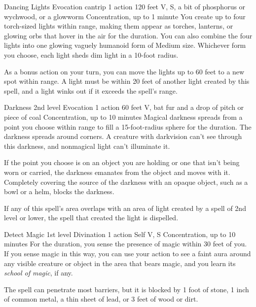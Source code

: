 \documentclass[10pt,a4paper,twoside,bg=print,twocolumn,openany,nodeprecatedcode]{dndbook}
\begin{document}


\DndSpellHeader%
{Dancing Lights}
{Evocation cantrip}
{1 action}
{120 feet}
{V, S, a bit of phosphorus or wychwood, or a glowworm}
{Concentration, up to 1 minute}
You create up to four torch-sized lights within range, making them appear as torches, lanterns, or glowing orbs that hover in the air for the duration. You can also combine the four lights into one glowing vaguely humanoid form of Medium size. Whichever form you choose, each light sheds dim light in a 10-foot radius.

As a bonus action on your turn, you can move the lights up to 60 feet to a new spot within range. A light must be within 20 feet of another light created by this spell, and a light winks out if it exceeds the spell's range.



\DndSpellHeader%
{Darkness}
{2nd level Evocation}
{1 action}
{60 feet}
{V, bat fur and a drop of pitch or piece of coal}
{Concentration, up to 10 minutes}
Magical darkness spreads from a point you choose within range to fill a 15-foot-radius sphere for the duration. The darkness spreads around corners. A creature with darkvision can't see through this darkness, and nonmagical light can't illuminate it.

If the point you choose is on an object you are holding or one that isn't being worn or carried, the darkness emanates from the object and moves with it. Completely covering the source of the darkness with an opaque object, such as a bowl or a helm, blocks the darkness.

If any of this spell's area overlaps with an area of light created by a spell of 2nd level or lower, the spell that created the light is dispelled.



\DndSpellHeader%
{Detect Magic}
{1st level Divination}
{1 action}
{Self}
{V, S}
{Concentration, up to 10 minutes}
For the duration, you sense the presence of magic within 30 feet of you. If you sense magic in this way, you can use your action to see a faint aura around any visible creature or object in the area that bears magic, and you learn its \textit{school of magic}, if any.

The spell can penetrate most barriers, but it is blocked by 1 foot of stone, 1 inch of common metal, a thin sheet of lead, or 3 feet of wood or dirt.
\end{document}
